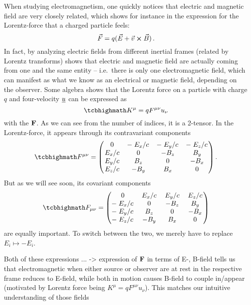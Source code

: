 \documentclass[../relativity_main.tex]{subfiles}
\begin{document}
When studying electromagnetism, one quickly notices that electric and magnetic field are very closely related, which shows for instance in the expression for the Lorentz-force that a charged particle feels:
\begin{equation*}
	\vec{F} = q (\vec{E} + \vec{v} \cross \vec{B})
	\, .
\end{equation*}
In fact, by analyzing electric fields from different inertial frames (related by Lorentz transforms) shows that electric and magnetic field are actually coming from one and the same entity -- i.e.~there is only one electromagnetic field, which can manifest as what we know as an electrical or magnetic field, depending on the observer. Some algebra shows that the Lorentz force on a particle with charge $q$ and four-velocity $\underline{u}$ can be expressed as
\begin{equation}\label{eq:lorentz_relativistic}
	\eqbox{
		K^\mu = q F^{\mu \nu} u_\nu
	}
\end{equation}
with the  $\mathbf{F}$. As we can see from the number of indices, it is a 2-tensor. In the Lorentz-force, it appears through its contravariant components
\begin{equation}\label{eq:em_field_tensor_contravariant}
	\eqbox{
		F^{\mu \nu} = 
		\mqty(
			0 & - \flatfrac{E_x}{c} & - \flatfrac{E_y}{c} & - \flatfrac{E_z}{c} \\
			\flatfrac{E_x}{c} & 0 & - B_z & B_y \\
			\flatfrac{E_y}{c} & B_z & 0 & - B_x \\
			\flatfrac{E_z}{c} & - B_y & B_x & 0
		)
	} \, .
\end{equation}
But as we will see soon, its covariant components
\begin{equation}\label{eq:em_field_tensor_covariant}
	\eqbox{
		F_{\mu \nu} = 
		\mqty(
			0 & \flatfrac{E_x}{c} & \flatfrac{E_y}{c} & \flatfrac{E_z}{c} \\
			- \flatfrac{E_x}{c} & 0 & - B_z & B_y \\
			- \flatfrac{E_y}{c} & B_z & 0 & - B_x \\
			- \flatfrac{E_z}{c} & - B_y & B_x & 0
		)
	}
\end{equation}
are equally important. To switch between the two, we merely have to replace $E_i \mapsto - E_i$.


Both of these expressions ... -> expression of $\mathbf{F}$ in terms of E-, B-field tells us that electromagnetic when either source or observer are at rest in the respective frame reduces to E-field, while both in motion causes B-field to couple in/appear (motivated by Lorentz force being $K^\mu = q F^{\mu \nu} u_\nu$). This matches our intuitive understanding of those fields
\end{document}
